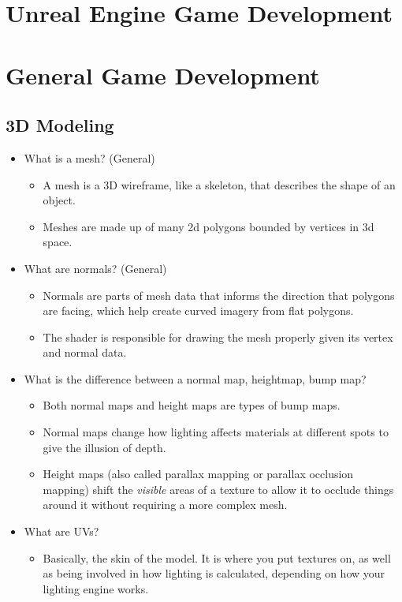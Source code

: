 \documentclass{article}
\begin{document}
\newpage
\section{Unreal Engine Game Development}

\newpage
\section{General Game Development}
\subsection{3D Modeling}
\begin{itemize}
    \item What is a mesh? (General)
    \begin{itemize}
        \item A mesh is a 3D wireframe, like a skeleton, that describes the shape of an object.
        \item Meshes are made up of many 2d polygons bounded by vertices in 3d space.
    \end{itemize}
    \item What are normals? (General)
    \begin{itemize}
        \item Normals are parts of mesh data that informs the direction that polygons are facing, which help create curved imagery from flat polygons.
        \item The shader is responsible for drawing the mesh properly given its vertex and normal data.
    \end{itemize}
    \item What is the difference between a normal map, heightmap, bump map?
    \begin{itemize}
        \item Both normal maps and height maps are types of bump maps.
        \item Normal maps change how lighting affects materials at different spots to give the illusion of depth.
        \item Height maps (also called parallax mapping or parallax occlusion mapping) shift the \textit{visible} areas of a texture to allow it to occlude things around it without requiring a more complex mesh.
    \end{itemize}
    \item What are UVs?
    \begin{itemize}
        \item Basically, the skin of the model. It is where you put textures on, as well as being involved in how lighting is calculated, depending on how your lighting engine works.

\end{itemize}
\end{itemize}
\end{document}
